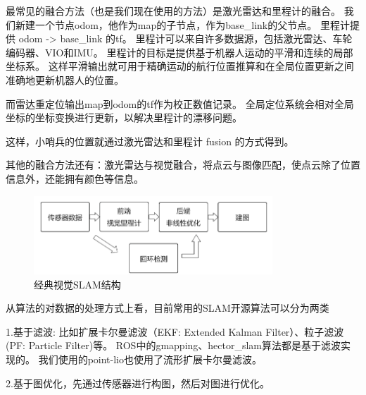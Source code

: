 最常见的融合方法（也是我们现在使用的方法）是激光雷达和里程计的融合。
我们新建一个节点odom，他作为map的子节点，作为base\_link的父节点。
里程计提供 odom -> base\_link 的tf。
里程计可以来自许多数据源，包括激光雷达、车轮编码器、VIO和IMU。
里程计的目标是提供基于机器人运动的平滑和连续的局部坐标系。
这样平滑输出就可用于精确运动的航行位置推算和在全局位置更新之间准确地更新机器人的位置。

而雷达重定位输出map到odom的tf作为校正数值记录。
全局定位系统会相对全局坐标的坐标变换进行更新，以解决里程计的漂移问题。

这样，小哨兵的位置就通过激光雷达和里程计 fusion 的方式得到。

其他的融合方法还有：激光雷达与视觉融合，将点云与图像匹配，使点云除了位置信息外，还能拥有颜色等信息。
\begin{figure}[H]
        \centering
        \includegraphics[width=0.8\textwidth]{./images/经典视觉SLAM结构.png}
        \caption{经典视觉SLAM结构}
\end{figure}

从算法的对数据的处理方式上看，目前常用的SLAM开源算法可以分为两类

1.基于滤波:
比如扩展卡尔曼滤波（EKF: Extended Kalman Filter）、粒子滤波(PF: Particle Filter)等。
ROS中的gmapping、hector\_slam算法都是基于滤波实现的。
我们使用的point-lio也使用了流形扩展卡尔曼滤波。

2.基于图优化，先通过传感器进行构图，然后对图进行优化。

